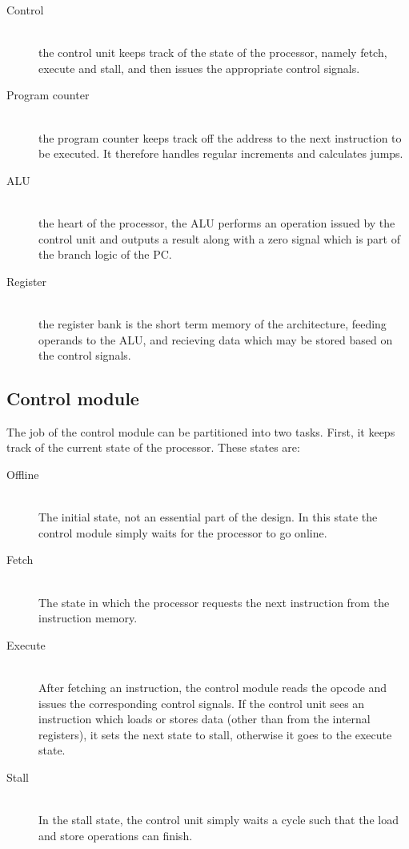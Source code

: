 \begin{description}
  \item[Control] \hfill \\
  the control unit keeps track of the state of the processor, namely fetch, execute and stall, and then issues the appropriate control signals.  
  \item[Program counter] \hfill \\
  the program counter keeps track off the address to the next instruction to be executed. It therefore handles regular increments and calculates jumps.
  \item[ALU] \hfill \\
  the heart of the processor, the ALU performs an operation issued by the control unit and outputs a result along with a zero signal which is part of the branch logic of the PC.
  \item[Register] \hfill \\
  the register bank is the short term memory of the architecture, feeding operands to the ALU, and recieving data which may be stored based on the control signals.
\end{description}

\subsection{Control module}
The job of the control module can be partitioned into two tasks.
First, it keeps track of the current state of the processor.
These states are:
\begin{description}
  \item[Offline] \hfill \\
  The initial state, not an essential part of the design. In this state the control module simply waits for the processor to go online.
  \item[Fetch] \hfill \\
  The state in which the processor requests the next instruction from the instruction memory.
  \item[Execute] \hfill \\
  After fetching an instruction, the control module reads the opcode and issues the corresponding control signals.
  If the control unit sees an instruction which loads or stores data (other than from the internal registers), it sets the next state to stall, otherwise it goes to the execute state.
  \item[Stall] \hfill \\
  In the stall state, the control unit simply waits a cycle such that the load and store operations can finish.
\end{description}

